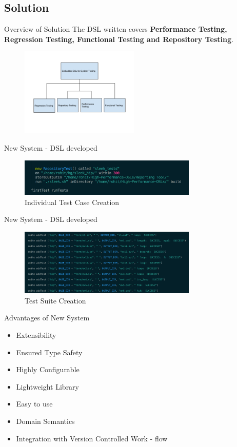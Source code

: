 \subsection{Solution}
\begin{frame}{Overview of Solution}
The DSL written covers \textbf{Performance Testing, Regression Testing, Functional Testing and Repository Testing}.
\begin{figure}[h!]
  \centering
    \includegraphics[height=160px]{figures/overview_of_solution.png}
\end{figure}
\end{frame}

\begin{frame}{New System - DSL developed}
\begin{figure}[H]
  \centering
    \includegraphics[width=320px]{figures/reportingDSL.png}
  \caption{Individual Test Case Creation}
\end{figure}
\end{frame}

\begin{frame}{New System - DSL developed}
\begin{figure}[H]
  \centering
    \includegraphics[width=320px]{figures/DSL_test_suite.png}
  \caption{Test Suite Creation}
\end{figure}
\end{frame}

\begin{frame}{Advantages of New System}
\begin{itemize}
\item Extensibility
\item Ensured Type Safety \cite{scala}
\item Highly Configurable
\item Lightweight Library
\item Easy to use
\item Domain Semantics \cite{dslsInAction}
\item Integration with Version Controlled Work - flow
\end{itemize}
\end{frame}

